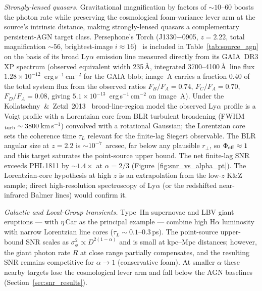 \documentclass[aps,prd,onecolumn,amsmath,amssymb]{revtex4-2}
\begin{document}
\textit{Strongly-lensed quasars.}
Gravitational magnification by factors of ${\sim}10$--$60$ boosts the photon
rate while preserving the cosmological foam-variance lever arm at the
source's intrinsic distance, making strongly-lensed quasars a complementary
persistent-AGN target class.
Persephone's Torch (J1330$-$0905, $z=2.22$, total magnification
${\sim}56$, brightest-image $i\approx 16$)~\cite{PersephonesTorch} is
included in Table~\ref{tab:source_agn} on the basis of its broad
Ly$\alpha$ emission line measured directly from its GAIA~DR3 XP spectrum
(observed equivalent width 235\,\AA, integrated 3700--4100\,\AA\ line
flux $1.28\times10^{-12}$~erg\,s$^{-1}$\,cm$^{-2}$ for the GAIA blob;
image~A carries a fraction 0.40 of the total system flux from the
observed ratios $F_B/F_A = 0.74$, $F_C/F_A = 0.70$, $F_D/F_A = 0.08$,
giving $5.1\times10^{-13}$~erg\,s$^{-1}$\,cm$^{-2}$ on image~A).
Under the Kollatschny~\&~Zetzl~2013~\cite{Kollatschny2013}
broad-line-region model the observed Ly$\alpha$ profile is a Voigt
profile with a Lorentzian core from BLR turbulent broadening
(FWHM$_{\rm turb} \sim 3800$\,km\,s$^{-1}$) convolved with a rotational
Gaussian; the Lorentzian core sets the coherence time $\tau_L$ relevant
for the finite-lag Siegert observable.  The BLR angular size at $z=2.2$
is $\sim 10^{-7}$~arcsec, far below any plausible $r_\perp$, so
$\Phi_{\rm eff}\approx 1$ and this target saturates the point-source
upper bound.
The net finite-lag SNR exceeds PHL\,1811 by ${\sim}1.4\times$ at
$\alpha = 2/3$ (Figure~\ref{fig:snr_vs_alpha_pt}).
The Lorentzian-core hypothesis at high $z$ is an extrapolation from the
low-$z$ K\&Z sample; direct high-resolution spectroscopy of Ly$\alpha$ (or
the redshifted near-infrared Balmer lines) would confirm it.

\textit{Galactic and Local-Group transients.}
Type~IIn supernovae and LBV giant eruptions --- with $\eta$\,Car as the
principal example --- combine high H$\alpha$ luminosity with narrow
Lorentzian line cores ($\tau_L \sim 0.1$--$0.3$\,ps).  The point-source
upper-bound SNR scales as $\sigma_\phi^2\propto D^{2(1-\alpha)}$ and is
small at kpc--Mpc distances; however, the giant photon rate $R$ at close
range partially compensates, and the resulting SNR remains competitive
for $\alpha\to 1$ (conservative foam).  At smaller $\alpha$ these
nearby targets lose the cosmological lever arm and fall below the AGN
baselines (Section~\ref{sec:snr_results}).
\end{document}

